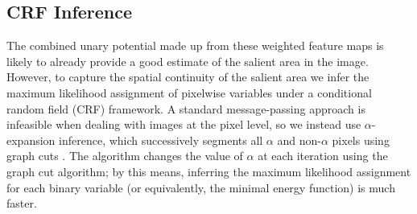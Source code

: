 \documentclass[10pt,twocolumn,letterpaper]{article}
\begin{document}
\subsection{CRF Inference}
The combined unary potential made up from these weighted feature maps is likely to already provide a good estimate of the salient area in the image.  However, to capture the spatial continuity of the salient area we infer the maximum likelihood assignment of pixelwise variables under a conditional random field (CRF) framework.  A standard message-passing approach is infeasible when dealing with images at the pixel level, so we instead use $\alpha$-expansion inference, which successively segments all $\alpha$ and non-$\alpha$ pixels using graph cuts \cite{graphcut}.  The algorithm changes the value of $\alpha$ at each iteration using the graph cut algorithm; by this means, inferring the maximum likelihood assignment for each binary variable (or equivalently, the minimal energy function) is much faster. 
\end{document}
